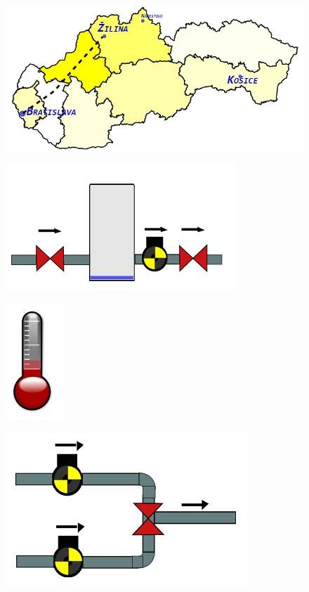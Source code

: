 \begin{figure}[H]
	\centering
	\includegraphics[width=0.7\linewidth]{obrazky/vzorovaSada/map}
\caption{}
\label{fig:map}
\end{figure}
\begin{figure}[H]
	\centering
	\includegraphics[width=0.7\linewidth]{obrazky/vzorovaSada/pump}
\caption{}
\label{fig:pump}
\end{figure}
\begin{figure}[H]
	\centering
	\includegraphics{obrazky/vzorovaSada/thermometer}
\caption{}
\label{fig:thermometer}
\end{figure}

\begin{figure}[H]
\centering
\includegraphics[width=0.7\linewidth]{obrazky/vzorovaSada/trippleValve}
\caption{}
\label{fig:trippleValve}
\end{figure}
